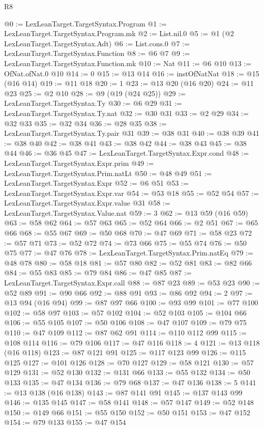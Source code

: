 \begin{lexlean}{R8}
\begin{coremodule}
@0 := LexLeanTarget.TargetSyntax.Program
@1 := LexLeanTarget.TargetSyntax.Program.mk
@2 := List.nil.{0}
@5 := @1 (@2 LexLeanTarget.TargetSyntax.Adt)
@6 := List.cons.{0}
@7 := LexLeanTarget.TargetSyntax.Function
@8 := @6 @7
@9 := LexLeanTarget.TargetSyntax.Function.mk
@10 := Nat
@11 := @6 @10
@13 := OfNat.ofNat.{0} @10
@14 := 0
@15 := @13 @14
@16 := instOfNatNat
@18 := @15 (@16 @14)
@19 := @11 @18
@20 := 1
@23 := @13 @20 (@16 @20)
@24 := @11 @23
@25 := @2 @10
@28 := @9 (@19 (@24 @25))
@29 := LexLeanTarget.TargetSyntax.Ty
@30 := @6 @29
@31 := LexLeanTarget.TargetSyntax.Ty.nat
@32 := @30 @31
@33 := @2 @29
@34 := @32 @33
@35 := @32 @34
@36 := @28 @35
@38 := LexLeanTarget.TargetSyntax.Ty.pair @31
@39 := @38 @31
@40 := @38 @39
@41 := @38 @40
@42 := @38 @41
@43 := @38 @42
@44 := @38 @43
@45 := @38 @44
@46 := @36 @45
@47 := LexLeanTarget.TargetSyntax.Expr.cond
@48 := LexLeanTarget.TargetSyntax.Expr.prim
@49 := LexLeanTarget.TargetSyntax.Prim.natLt
@50 := @48 @49
@51 := LexLeanTarget.TargetSyntax.Expr
@52 := @6 @51
@53 := LexLeanTarget.TargetSyntax.Expr.var
@54 := @53 @18
@55 := @52 @54
@57 := LexLeanTarget.TargetSyntax.Expr.value @31
@58 := LexLeanTarget.TargetSyntax.Value.nat
@59 := 3
@62 := @13 @59 (@16 @59)
@63 := @58 @62
@64 := @57 @63
@65 := @52 @64
@66 := @2 @51
@67 := @65 @66
@68 := @55 @67
@69 := @50 @68
@70 := @47 @69
@71 := @58 @23
@72 := @57 @71
@73 := @52 @72
@74 := @73 @66
@75 := @55 @74
@76 := @50 @75
@77 := @47 @76
@78 := LexLeanTarget.TargetSyntax.Prim.natEq
@79 := @48 @78
@80 := @58 @18
@81 := @57 @80
@82 := @52 @81
@83 := @82 @66
@84 := @55 @83
@85 := @79 @84
@86 := @47 @85
@87 := LexLeanTarget.TargetSyntax.Expr.call
@88 := @87 @23
@89 := @53 @23
@90 := @52 @89
@91 := @90 @66
@92 := @88 @91
@93 := @86 @92
@94 := 2
@97 := @13 @94 (@16 @94)
@99 := @87 @97 @66
@100 := @93 @99
@101 := @77 @100
@102 := @58 @97
@103 := @57 @102
@104 := @52 @103
@105 := @104 @66
@106 := @55 @105
@107 := @50 @106
@108 := @47 @107
@109 := @79 @75
@110 := @47 @109
@112 := @87 @62 @91
@114 := @110 @112 @99
@115 := @108 @114
@116 := @79 @106
@117 := @47 @116
@118 := 4
@121 := @13 @118 (@16 @118)
@123 := @87 @121 @91
@125 := @117 @123 @99
@126 := @115 @125
@127 := @101 @126
@128 := @70 @127
@129 := @58 @121
@130 := @57 @129
@131 := @52 @130
@132 := @131 @66
@133 := @55 @132
@134 := @50 @133
@135 := @47 @134
@136 := @79 @68
@137 := @47 @136
@138 := 5
@141 := @13 @138 (@16 @138)
@143 := @87 @141 @91
@145 := @137 @143 @99
@146 := @135 @145
@147 := @58 @141
@148 := @57 @147
@149 := @52 @148
@150 := @149 @66
@151 := @55 @150
@152 := @50 @151
@153 := @47 @152
@154 := @79 @133
@155 := @47 @154

\end{coremodule}
\end{lexlean}
